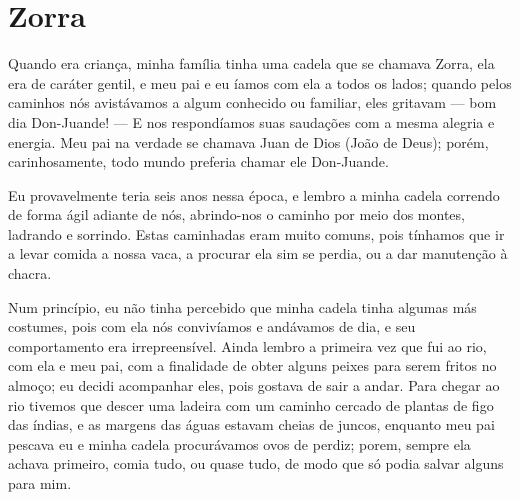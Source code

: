 
\chapter{Zorra}
Quando era criança, minha família tinha uma cadela que se chamava Zorra, ela era de caráter gentil, e meu pai e eu íamos com ela a todos os lados; quando pelos caminhos nós avistávamos a algum conhecido ou familiar, eles gritavam --- bom dia Don-Juande! --- E nos respondíamos suas saudações com a mesma alegria e energia.
Meu pai na verdade se chamava Juan de Dios (João de Deus); porém, carinhosamente, todo mundo preferia chamar ele Don-Juande.

Eu provavelmente teria seis anos nessa época, e lembro a minha cadela correndo de forma ágil adiante de nós, abrindo-nos o caminho por meio dos montes, ladrando e sorrindo.
Estas caminhadas eram muito comuns, pois tínhamos que ir a levar comida a nossa vaca, a procurar ela sim se perdia, ou a dar manutenção à chacra.

Num princípio, eu não tinha percebido que minha cadela tinha algumas más costumes, pois com ela nós convivíamos e andávamos de dia, e seu comportamento era irrepreensível. 
Ainda lembro a primeira vez que fui ao rio, com ela e meu pai, com a finalidade de obter alguns peixes para serem fritos no almoço; eu decidi acompanhar eles, pois gostava de sair a andar. 
Para chegar ao rio tivemos que descer uma ladeira com um caminho cercado de plantas de figo das índias, e as margens das águas estavam cheias de juncos, enquanto meu pai pescava eu e minha cadela procurávamos ovos de perdiz; porem, sempre ela achava primeiro, comia tudo, ou quase tudo, de modo que só podia salvar alguns para mim.



